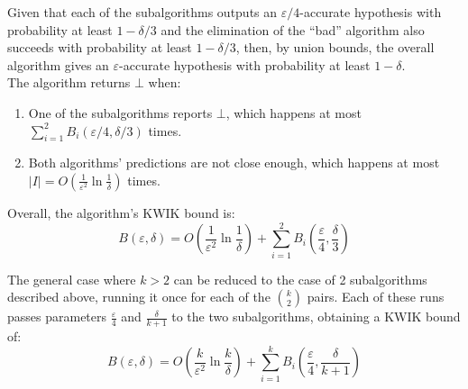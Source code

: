 Given that each of the subalgorithms outputs an $\varepsilon/4$-accurate hypothesis
with probability at least $1 - \delta/3$ and the elimination of the ``bad''
algorithm also succeeds with probability at least $1 - \delta/3$, then, by union
bounds, the overall algorithm gives an $\varepsilon$-accurate hypothesis with
probability at least $1 - \delta$. \\

The algorithm returns $\bot$ when:
\begin{enumerate}
  \item One of the subalgorithms reports $\bot$, which happens at most
  $\sum_{i = 1}^2 B_i(\varepsilon/4, \delta/3)$ times.
  \item Both algorithms' predictions are not close enough, which happens at most
  $|I| = O\left( \frac{1}{\varepsilon^2} \ln \frac{1}{\delta} \right)$ times.
\end{enumerate}
Overall, the algorithm's KWIK bound is:
$$B(\varepsilon, \delta) = O\left( \frac{1}{\varepsilon^2} \ln \frac{1}{\delta}
\right) + \sum_{i = 1}^2 B_i\left(\frac{\varepsilon}{4}, \frac{\delta}{3}\right)$$

The general case where $k > 2$ can be reduced to the case of 2 subalgorithms
described above, running it once for each of the ${k \choose 2}$ pairs. Each
of these runs passes parameters $\frac{\varepsilon}{4}$ and $\frac{\delta}{k+1}$
to the two subalgorithms, obtaining a KWIK bound of:
$$B(\varepsilon, \delta) = O\left( \frac{k}{\varepsilon^2} \ln \frac{k}{\delta}
\right) + \sum_{i=1}^k B_i \left( \frac{\varepsilon}{4}, \frac{\delta}{k + 1}
\right)$$

